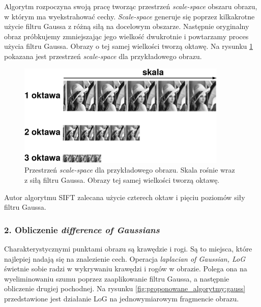 Algorytm rozpoczyna swoją pracę tworząc przestrzeń \textit{scale-space} obszaru obrazu, w którym ma wyekstrahować cechy. \textit{Scale-space} generuje się poprzez kilkakrotne użycie filtru Gaussa z różną siłą na docelowym obszarze. Następnie oryginalny obraz próbkujemy zmniejszając jego wielkość dwukrotnie i powtarzamy proces użycia filtru Gaussa. Obrazy o tej samej wielkości tworzą oktawę. Na rysunku \ref{fig:proponowane_algorytmy:scale_space_fig} pokazana jest przestrzeń \textit{scale-space} dla przykładowego obrazu.

\begin{figure}[H]
  \centering
  \includegraphics[width=10cm]{gfx/scale_space}
  \caption{Przestrzeń \textit{scale-space} dla przykładowego obrazu. Skala rośnie wraz z siłą filtru Gaussa. Obrazy tej samej wielkości tworzą oktawę.}
  \label{fig:proponowane_algorytmy:scale_space_fig}
\end{figure}

Autor algorytmu SIFT zalecana użycie czterech oktaw i pięciu poziomów siły filtru Gaussa.

\subsubsection{2. Obliczenie \textit{difference of Gaussians}}
\label{sec:proponowane_algorytmy:difference}

Charakterystycznymi punktami obrazu są krawędzie i rogi. Są to miejsca, które najlepiej nadają się na znalezienie cech. Operacja \textit{laplacian of Gaussian, LoG} świetnie sobie radzi w wykrywaniu krawędzi i rogów w obrazie. Polega ona na wyeliminowaniu szumu poprzez zaaplikowanie filtru Gaussa, a następnie obliczenie drugiej pochodnej. Na rysunku \ref{fig:proponowane_algorytmy:gauss} przedstawione jest działanie LoG na jednowymiarowym fragmencie obrazu.

